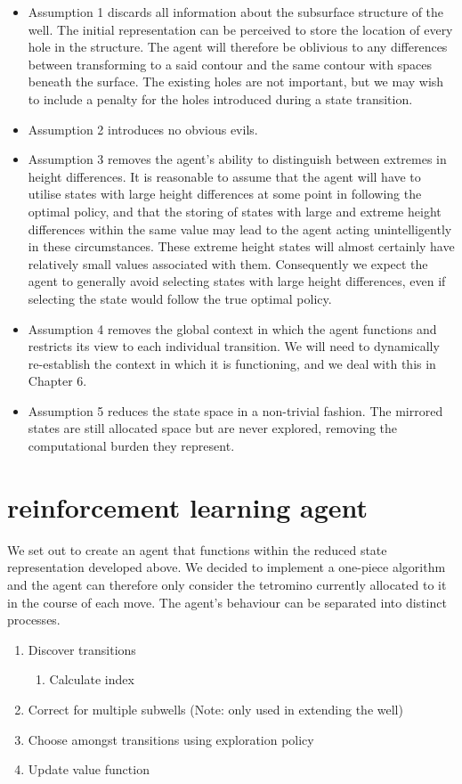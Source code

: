 \documentclass{rucsthesis}
\begin{document}
\begin{itemize}
\item{Assumption 1 discards all information about the subsurface structure of the well. The initial representation can be perceived to store the location of every hole in the structure. The agent will therefore be oblivious to any differences between transforming to a said contour and the same contour with spaces beneath the surface. The existing holes are not important, but we may wish to include a penalty for the holes introduced during a state transition.}
\item{Assumption 2 introduces no obvious evils.}
\item{Assumption 3 removes the agent's ability to distinguish between extremes in height differences. It is reasonable to assume that the agent will have to utilise states with large height differences at some point in following the optimal policy, and that the storing of states with large and extreme height differences within the same value may lead to the agent acting unintelligently in these circumstances. These extreme height states will almost certainly have relatively small values associated with them. Consequently we expect the agent to generally avoid selecting states with large height differences, even if selecting the state would follow the true optimal policy.}
\item{Assumption 4 removes the global context in which the agent functions and restricts its view to each individual transition. We will need to dynamically re-establish the context in which it is functioning, and we deal with this in Chapter 6.}
\item{Assumption 5 reduces the state space in a non-trivial fashion. The mirrored states are still allocated space but are never explored, removing the computational burden they represent.}
\end{itemize}

\section{reinforcement learning agent}

We set out to create an agent that functions within the reduced state representation developed above. We decided to implement a one-piece algorithm and the agent can therefore only consider the tetromino currently allocated to it in the course of each move. The agent's behaviour can be separated into distinct processes.

\begin{enumerate}
\item{Discover transitions}
\begin{enumerate}
\item{Calculate index}
\end{enumerate}
\item{Correct for multiple subwells (Note: only used in extending the well) }
\item{Choose amongst transitions using exploration policy}
\item{Update value function}
\end{enumerate}
\end{document}
